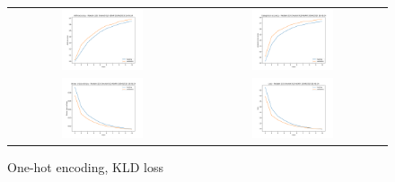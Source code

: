 \begin{appendices}
        \begin{figure}[H]
            \centering
            \begin{tabular}{cc}
                \includegraphics[width=0.45\textwidth]{figures/training_plots/ModelA-(1D)-OneHot-KLD-ADAM_10-04-2019_18-45-24_AON-accuracy.pdf} & \includegraphics[width=0.45\textwidth]{figures/training_plots/ModelA-(1D)-OneHot-KLD-ADAM_10-04-2019_18-45-24_categorical-accuracy.pdf} \\
                \includegraphics[width=0.45\textwidth]{figures/training_plots/ModelA-(1D)-OneHot-KLD-ADAM_10-04-2019_18-45-24_binary-cross-entropy.pdf} & \includegraphics[width=0.45\textwidth]{figures/training_plots/ModelA-(1D)-OneHot-KLD-ADAM_10-04-2019_18-45-24_loss.pdf}
            \end{tabular}
            \caption*{One-hot encoding, KLD loss}
        \end{figure}
        

\end{appendices}
